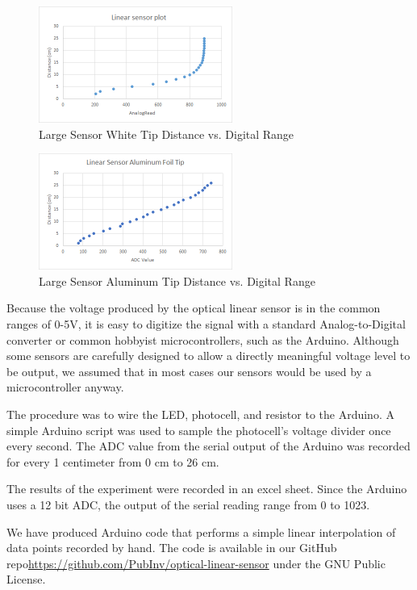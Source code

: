 \documentclass[10pt,conference,compsocconf]{IEEEtran}
\begin{document}
\begin{figure}
  \centering
  \includegraphics[width=2.5in]{figures/WhiteLargeDistanceVsRead.png}
  \caption{Large Sensor White Tip Distance vs. Digital Range}  
\end{figure}

\begin{figure}
  \centering
  \includegraphics[width=2.5in]{figures/AluminumLargeFoil.png}
  \caption{Large Sensor Aluminum Tip Distance vs. Digital Range}  
\end{figure}


Because the voltage produced by the optical linear sensor is in the
common ranges of 0-5V, it is easy to digitize the signal with a
standard Analog-to-Digital converter or common hobbyist
microcontrollers, such as the Arduino. Although some sensors are
carefully designed to allow a directly meaningful voltage level to be
output, we assumed that in most cases our sensors would be used by a
microcontroller anyway.


The procedure was to wire the LED, photocell, and resistor to the
Arduino. A simple Arduino script was used to sample the photocell’s
voltage divider once every second. The ADC value from the serial
output of the Arduino was recorded for every 1 centimeter from 0 cm to
26 cm.

The results of the experiment were recorded in an excel sheet. Since
the Arduino uses a 12 bit ADC, the output of the serial reading range
from 0 to 1023. 

We have produced Arduino code that performs a simple linear
interpolation of data points recorded by hand. The code is available
in our GitHub repo\url{https://github.com/PubInv/optical-linear-sensor}\cite{SourceCode}
under the GNU Public License. 
\end{document}
